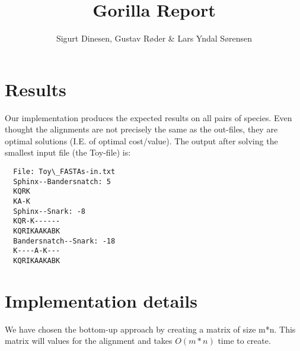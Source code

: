 \documentclass{tufte-handout}
\title{Gorilla Report}
\author{Sigurt Dinesen, Gustav Røder \& Lars Yndal Sørensen}
\begin{document}
  \maketitle

  \section{Results}
	Our implementation produces the expected results on all pairs of
	species. Even thought the alignments are not precisely the same as the
	out-files, they are optimal solutions (I.E. of optimal cost/value).
	The output after solving the smallest input file (the Toy-file) is:

  \begin{fullwidth}\small
  	\begin{verbatim}
  File: Toy\_FASTAs-in.txt
  Sphinx--Bandersnatch: 5
  KQRK
  KA-K
  Sphinx--Snark: -8
  KQR-K------
  KQRIKAAKABK
  Bandersnatch--Snark: -18
  K----A-K---
  KQRIKAAKABK
   \end{verbatim}
\end{fullwidth}


  \section{Implementation details}
	We have chosen the bottom-up approach by creating a matrix of size m*n. This matrix will values for the alignment and takes $O(m*n)$ time to create.
\end{document}
